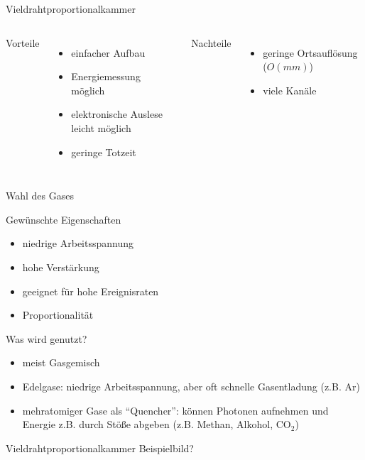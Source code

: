 \begin{frame}{Vieldrahtproportionalkammer}
    \begin{columns}[T]
			Vorteile		
			\begin{itemize}
				\item einfacher Aufbau
			  	\item Energiemessung möglich
			  	\item elektronische Auslese leicht möglich
			  	\item geringe Totzeit 
			\end{itemize}	
	    	Nachteile
	    	\begin{itemize}
			  \item geringe Ortsauflösung ($O(mm)$)
			  \item viele Kanäle
			\end{itemize}
    \end{columns}
    \vspace{1cm}
\end{frame}

\begin{frame}{Wahl des Gases}
	\begin{block}{Gewünschte Eigenschaften}
		\begin{itemize}
		  \item niedrige Arbeitsspannung
		  \item hohe Verstärkung
		  \item geeignet für hohe Ereignisraten
		  \item Proportionalität
		\end{itemize}
	\end{block}
	\begin{block}{Was wird genutzt?}
		\begin{itemize}
			\item meist Gasgemisch
			\item Edelgase: niedrige Arbeitsspannung, aber oft schnelle Gasentladung (z.B. Ar)
			\item mehratomiger Gase als "`Quencher"': können Photonen aufnehmen und Energie z.B. durch
			Stöße abgeben (z.B. Methan, Alkohol, CO$_2$)
		\end{itemize}
	\end{block}
\end{frame}

\begin{frame}{Vieldrahtproportionalkammer}
    Beispielbild?
\end{frame}
